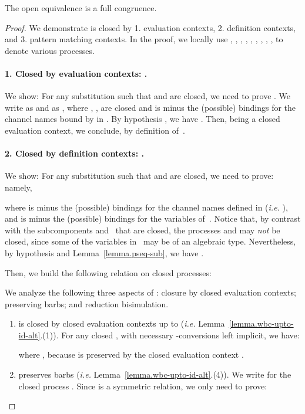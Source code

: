 \documentclass{LMCS}
\makeatletter
\newcommand{\resetequationcounter}{\setcounter{equation}{0}}
\newcommand{\ie}{\emph{i.e.}\@\xspace}
\renewcommand{\_}{\mathord{\rule[-.25ex]{1ex}{.15ex}}}
\newcommand{\C}[1]{\llbracket#1\rrbracket}
\newcommand{\dd}{\mathcal{D}}
\makeatother
\begin{document}
\begin{thm}\label{th.pseq-cong}
  The open equivalence  is a full congruence.
\end{thm}
\resetequationcounter
\begin{proof}
  We demonstrate  is closed by 1. evaluation contexts, 2.
  definition contexts, and 3. pattern matching contexts.
  In the proof, we locally use , , , , , , , ,
  ,  to denote various processes.

  \paragraph{\bf 1. Closed by evaluation contexts:
    .}  We show:  For any substitution  such
  that  and  are
  closed, we need to prove .  We write  as
   and  as
  , where ,
  ,  are closed and  is
   minus the (possible) bindings for the channel names bound
  by  in . By hypothesis , we have
  .  Then, 
  being a closed evaluation context, we conclude, by definition
  of~.
  
  \paragraph{\bf 2. Closed by definition contexts: .}
  We show:  For
  any substitution  such that  and
   are closed, we need to prove:  namely,
  
  where  is  minus the (possible) bindings for the
  channel names defined in  (\ie
  ), and  is  minus
  the (possible) bindings for the variables of~.  Notice that,
  by contrast with the subcomponents  and~ that
  are closed, the processes  and  may \emph{not}
  be closed, since some of the variables in~ may be of an
  algebraic type.  Nevertheless, by hypothesis  and
  Lemma~\ref{lemma.pseq-sub}, we have .

  Then, we build the following relation  on closed processes:
  
  We analyze the following three aspects of : closure
  by closed evaluation contexts; preserving barbs; and reduction
  bisimulation.

  \begin{enumerate}[]
  \item  is closed by closed evaluation contexts up to 
    (\ie Lemma~\ref{lemma.wbc-upto-id-alt}.(1)). For any closed
    , with necessary -conversions left
    implicit, we have:
    
    where , because  is preserved by
    the closed evaluation context .
   
    \def\C#1{\dd[#1]}
  \item  preserves barbs (\ie
    Lemma~\ref{lemma.wbc-upto-id-alt}.(4)).  We write  for
    the closed process .  Since
     is a symmetric relation, we only need to prove:
    

\end{enumerate}
\end{proof}
\end{document}
